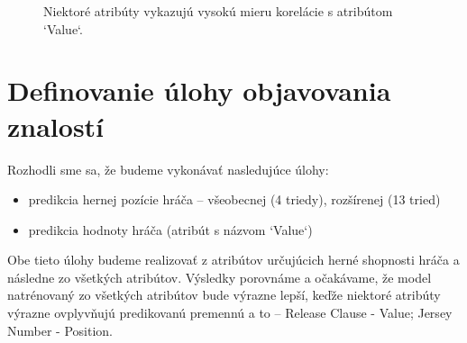 \documentclass[runningheads]{llncs}
\begin{document}
\begin{figure}%
    \centering
    \qquad
    \caption{Niektoré atribúty vykazujú vysokú mieru korelácie s atribútom `Value`.}%
    \label{fig:wage_scatter_plot}%
\end{figure}


\section{Definovanie úlohy objavovania znalostí}

Rozhodli sme sa, že budeme vykonávať nasledujúce úlohy:
\begin{itemize}
    \item predikcia hernej pozície hráča -- všeobecnej (4 triedy), rozšírenej (13 tried)
    \item predikcia hodnoty hráča (atribút s názvom `Value`)
\end{itemize}

Obe tieto úlohy budeme realizovať z atribútov určujúcich herné shopnosti hráča a následne zo všetkých atribútov. Výsledky porovnáme a očakávame, že model natrénovaný zo všetkých atribútov bude výrazne lepší, keďže niektoré atribúty výrazne ovplyvňujú predikovanú premennú a to -- Release Clause - Value; Jersey Number - Position. 
\end{document}
